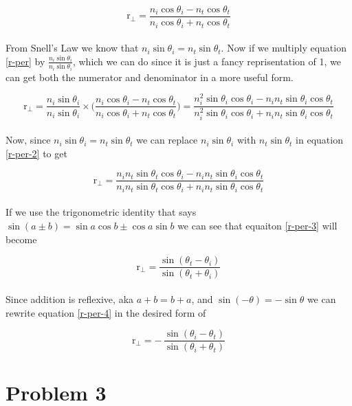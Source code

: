 \documentclass{article}
\begin{document}
	\begin{equation} \label{r-per}
		\mathrm{r}_{\bot} = 
		\dfrac{n_i \cos \theta_i - n_t \cos \theta_t}{n_i \cos \theta_i + n_t \cos \theta_t}
	\end{equation}
	\\
	From Snell's Law we know that $n_i \sin \theta_i = n_t \sin \theta_t$. Now if we multiply equation 
	\ref{r-per} by $ \frac{n_i \sin \theta_i}{n_i \sin \theta_i} $, which we can do since it is just a fancy 
	reprisentation of 1, we can get both the numerator and denominator in a more useful form. 
	
	\begin{equation} \label{r-per-2}
		\mathrm{r}_{\bot} = \dfrac{n_i \sin \theta_i}{n_i \sin \theta_i} \times \Big(
		\dfrac{n_i \cos \theta_i - n_t \cos \theta_t}{n_i \cos \theta_i + n_t \cos \theta_t} \Big) = 
		\dfrac{n^2_i \sin \theta_i \cos \theta_i - n_i n_t \sin \theta_i \cos \theta_t}
		{n^2_i \sin \theta_i \cos \theta_i + n_i n_t \sin \theta_i \cos \theta_t}
	\end{equation}
	\\
	Now, since $n_i \sin \theta_i = n_t \sin \theta_t$ we can replace $n_i \sin \theta_i$ with $n_t \sin \theta_t$ in equation \ref{r-per-2} to get 
	
	\begin{equation} \label{r-per-3}
		\mathrm{r}_{\bot} = 
		\dfrac{n_i n_t \sin \theta_t \cos \theta_i - n_i n_t \sin \theta_i \cos \theta_t}
		{n_i n_t \sin \theta_t \cos \theta_i + n_i n_t \sin \theta_i \cos \theta_t}
	\end{equation}
	\\
	If we use the trigonometric identity that says $\sin(a \pm b) = \sin a \cos b \pm \cos a \sin b$ we can see
	that equaiton \ref{r-per-3} will become 
	
	\begin{equation} \label{r-per-4}
		\mathrm{r}_{\bot} = 
		\dfrac{\sin(\theta_t - \theta_i)}{\sin(\theta_t + \theta_i)}
	\end{equation}
	\\
	Since addition is reflexive, aka $a + b = b + a$, and $\sin(-\theta) = - \sin{\theta}$ we can rewrite 
	equation \ref{r-per-4} in the desired form of 
	
	\begin{equation*}
		\mathrm{r}_{\bot} = 
		- \,\dfrac{\sin(\theta_i - \theta_t)}{\sin(\theta_i + \theta_t)}
	\end{equation*}
	
	\pagebreak
	\section*{Problem 3}
	
\end{document}
